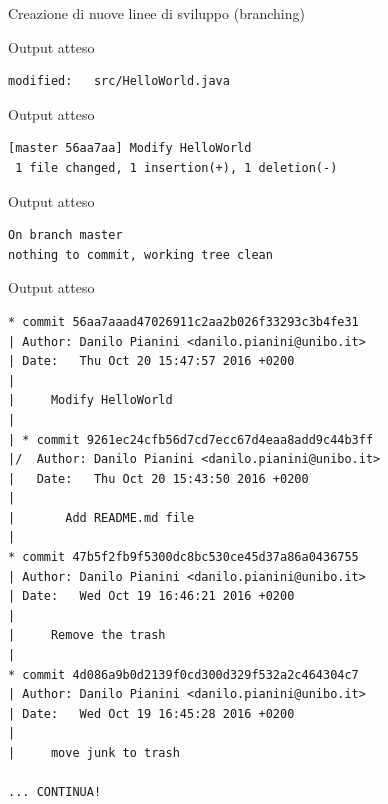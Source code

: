 \documentclass[xcolor=dvipsnames,presentation]{beamer}
\begin{document}
\begin{frame}{Creazione di nuove linee di sviluppo (branching)}
\begin{block}{Output atteso}
\begin{Verbatim}[fontsize=\scriptsize]
        modified:   src/HelloWorld.java

		\end{Verbatim}
	\end{block}
	\begin{block}{Output atteso}
		\begin{Verbatim}[fontsize=\scriptsize]
[master 56aa7aa] Modify HelloWorld
 1 file changed, 1 insertion(+), 1 deletion(-)
		\end{Verbatim}
	\end{block}
	\begin{block}{Output atteso}
		\begin{Verbatim}[fontsize=\scriptsize]
On branch master
nothing to commit, working tree clean
		\end{Verbatim}
	\end{block}
	\begin{block}{Output atteso}
		\begin{Verbatim}[fontsize=\tiny]
* commit 56aa7aaad47026911c2aa2b026f33293c3b4fe31
| Author: Danilo Pianini <danilo.pianini@unibo.it>
| Date:   Thu Oct 20 15:47:57 2016 +0200
|
|     Modify HelloWorld
|
| * commit 9261ec24cfb56d7cd7ecc67d4eaa8add9c44b3ff
|/  Author: Danilo Pianini <danilo.pianini@unibo.it>
|   Date:   Thu Oct 20 15:43:50 2016 +0200
|
|       Add README.md file
|
* commit 47b5f2fb9f5300dc8bc530ce45d37a86a0436755
| Author: Danilo Pianini <danilo.pianini@unibo.it>
| Date:   Wed Oct 19 16:46:21 2016 +0200
|
|     Remove the trash
|
* commit 4d086a9b0d2139f0cd300d329f532a2c464304c7
| Author: Danilo Pianini <danilo.pianini@unibo.it>
| Date:   Wed Oct 19 16:45:28 2016 +0200
|
|     move junk to trash

... CONTINUA!
		\end{Verbatim}
	\end{block}
\end{frame}
\end{document}
